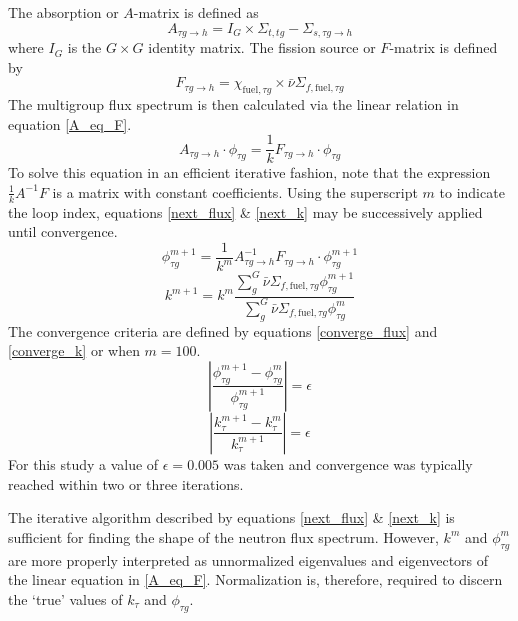 The absorption or $A$-matrix is defined as 
\begin{equation}
\label{A_matrix}
A_{\tau g\to h} = I_G \times \Sigma_{t,tg} - \Sigma_{s,\tau g\to h}
\end{equation}
where $I_G$ is the $G \times G$ identity matrix. The fission source or $F$-matrix is defined by
\begin{equation}
\label{F_matrix}
F_{\tau g\to h} = \chi_{\mbox{fuel},\tau g} \times \bar{\nu} \Sigma_{f,\mbox{fuel},\tau g}
\end{equation}
The multigroup flux spectrum is then calculated via the linear relation in equation \ref{A_eq_F}.
\begin{equation}
\label{A_eq_F}
A_{\tau g\to h} \cdot \phi_{\tau g} = \frac{1}{k} F_{\tau g\to h} \cdot \phi_{\tau g}
\end{equation}
To solve this equation in an efficient iterative fashion, note that the expression 
$\frac{1}{k}A^{-1}F$ is a matrix with constant coefficients.
Using the superscript $m$ to indicate the loop
index, equations \ref{next_flux} \& \ref{next_k} may be successively applied 
until convergence.
\begin{equation}
\label{next_flux}
\phi_{\tau g}^{m+1} = \frac{1}{k^m} A_{\tau g\to h}^{-1} F_{\tau g\to h} \cdot \phi_{\tau g}^{m+1}
\end{equation}
\begin{equation}
\label{next_k}
k^{m+1} = k^m  \frac{\sum_g^G \bar{\nu} \Sigma_{f,\mbox{fuel},\tau g} \phi_{\tau g}^{m+1}}
                         {\sum_g^G \bar{\nu} \Sigma_{f,\mbox{fuel},\tau g} \phi_{\tau g}^m}
\end{equation}
The convergence criteria are defined by equations \ref{converge_flux} and \ref{converge_k}
or when $m=100$.
\begin{equation}
\label{converge_flux}
\left|\frac{\phi_{\tau g}^{m+1} - \phi_{\tau g}^m}{\phi_{\tau g}^{m+1}}\right| = \epsilon
\end{equation}
\begin{equation}
\label{converge_k}
\left|\frac{k_{\tau}^{m+1} - k_{\tau}^m}{k_{\tau}^{m+1}}\right| = \epsilon
\end{equation}
For this study a value of $\epsilon=0.005$ was taken and convergence was typically 
reached within two or three iterations.

The iterative algorithm described by equations \ref{next_flux} \& \ref{next_k} is 
sufficient for finding the shape of the neutron flux spectrum.  However, $k^m$ and 
$\phi_{\tau g}^m$ are more properly interpreted as unnormalized eigenvalues and eigenvectors
of the linear equation in \ref{A_eq_F}.  Normalization is, therefore, required to 
discern the `true' values of  $k_{\tau}$ and $\phi_{\tau g}$.

